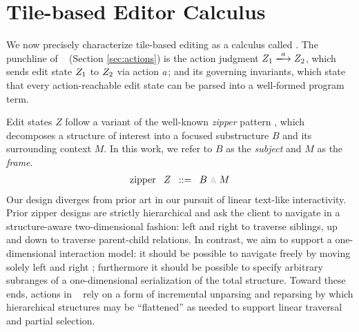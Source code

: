 
\section{Tile-based Editor Calculus}\label{sec:formalism}

We now precisely characterize tile-based editing
as a calculus called \ty.
The punchline of \ty~ (Section \ref{sec:actions})
is the action judgment
$\performAction{\editState_1}{\action}{\editState_2}$,
which sends edit state $Z_1$ to $Z_2$
via action $a$; and its governing invariants,
which state that every action-reachable edit state
can be parsed into a well-formed program term.




Edit states $Z$ follow a variant of the well-known 
\emph{zipper}
pattern \cite{zipper}, which decomposes a structure of interest
into a focused substructure $B$ and its surrounding context $M$.
In this work, we refer to $B$ as the \emph{subject}
and $M$ as the \emph{frame}.
\[
\arraycolsep=4pt
\begin{array}{rlrl}
  \text{zipper} & \zip & ::= & \zipper{\subject}{\zframe}
\end{array}
\]
Our design diverges from prior art in our pursuit
of linear text-like interactivity.
Prior zipper designs are strictly hierarchical and ask
the client to navigate in a structure-aware two-dimensional
fashion: left and right to traverse siblings,
up and down to traverse parent-child relations.
In contrast, we aim to support a one-dimensional interaction
model:
it should be possible to navigate freely by moving solely
left and right ;
furthermore it should be possible to specify
arbitrary subranges of a one-dimensional serialization
of the total structure.
Toward these ends, actions in \ty~ rely
on a form of incremental unparsing and reparsing by which
hierarchical structures may be ``flattened'' as needed
to support linear traversal and partial selection.

